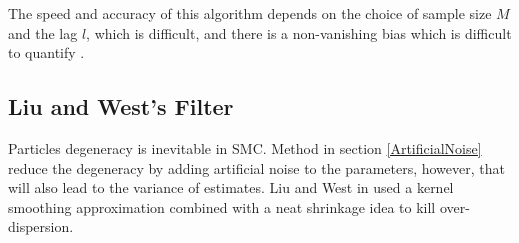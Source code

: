 The speed and accuracy of this algorithm depends on the choice of sample size $M$ and the lag $l$, which is difficult, and there is a non-vanishing bias which is difficult to quantify \cite{polson2008practical} \cite{kantas2009overview}.










\subsection{Liu and West's Filter}

Particles degeneracy is inevitable in SMC. Method in section \ref{ArtificialNoise} reduce the degeneracy by adding artificial noise to the parameters, however, that will also lead to the variance of estimates. Liu and West in \cite{liu2001combined} used a kernel smoothing approximation combined with a neat shrinkage idea to kill over-dispersion. 

